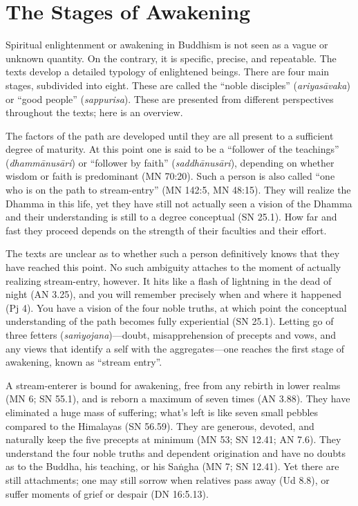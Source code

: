 \documentclass[12pt,openany]{book}%
\begin{document}
\section*{The Stages of Awakening}

Spiritual enlightenment or awakening in Buddhism is not seen as a vague or unknown quantity. On the contrary, it is specific, precise, and repeatable. The texts develop a detailed typology of enlightened beings. There are four main stages, subdivided into eight. These are called the “noble disciples” (\textit{\textsanskrit{ariyasāvaka}}) or “good people” (\textit{sappurisa}). These are presented from different perspectives throughout the texts; here is an overview.

The factors of the path are developed until they are all present to a sufficient degree of maturity. At this point one is said to be a “follower of the teachings” (\textit{\textsanskrit{dhammānusāri}}) or “follower by faith” (\textit{\textsanskrit{saddhānusāri}}), depending on whether wisdom or faith is predominant (MN 70:20). Such a person is also called “one who is on the path to stream-entry” (MN 142:5, MN 48:15). They will realize the Dhamma in this life, yet they have still not actually seen a vision of the Dhamma and their understanding is still to a degree conceptual (SN 25.1). How far and fast they proceed depends on the strength of their faculties and their effort.

The texts are unclear as to whether such a person definitively knows that they have reached this point. No such ambiguity attaches to the moment of actually realizing stream-entry, however. It hits like a flash of lightning in the dead of night (AN 3.25), and you will remember precisely when and where it happened (Pj 4). You have a vision of the four noble truths, at which point the conceptual understanding of the path becomes fully experiential (SN 25.1). Letting go of three fetters (\textit{\textsanskrit{saṁyojana}})—doubt, misapprehension of precepts and vows, and any views that identify a self with the aggregates—one reaches the first stage of awakening, known as “stream entry”.

A stream-enterer is bound for awakening, free from any rebirth in lower realms (MN 6; SN 55.1), and is reborn a maximum of seven times (AN 3.88). They have eliminated a huge mass of suffering; what’s left is like seven small pebbles compared to the Himalayas (SN 56.59). They are generous, devoted, and naturally keep the five precepts at minimum (MN 53; SN 12.41; AN 7.6). They understand the four noble truths and dependent origination and have no doubts as to the Buddha, his teaching, or his \textsanskrit{Saṅgha} (MN 7; SN 12.41). Yet there are still attachments; one may still sorrow when relatives pass away (Ud 8.8), or suffer moments of grief or despair (DN 16:5.13).
\end{document}
